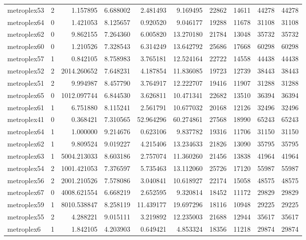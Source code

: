 \begin{longtable}{|l|r|r|r|r|r|r|r|r|r|}
metroplex53 & 2 & 1.157895 & 6.688002 & 2.481493 & 9.169495 & 22862 & 14611 & 44278 & 44278 \\
metroplex64 & 0 & 1.421053 & 8.125657 & 0.920520 & 9.046177 & 19288 & 11678 & 31108 & 31108 \\
metroplex62 & 0 & 9.862155 & 7.264360 & 6.005820 & 13.270180 & 21784 & 13048 & 35732 & 35732 \\
metroplex60 & 0 & 1.210526 & 7.328543 & 6.314249 & 13.642792 & 25686 & 17668 & 60298 & 60298 \\
metroplex57 & 1 & 0.842105 & 8.758983 & 3.765181 & 12.524164 & 22722 & 14558 & 44438 & 44438 \\
metroplex52 & 2 & 2014.260652 & 7.648231 & 4.187854 & 11.836085 & 19723 & 12739 & 38443 & 38443 \\
metroplex51 & 2 & 9.994987 & 8.457790 & 3.764917 & 12.222707 & 19416 & 11907 & 31288 & 31288 \\
metroplex65 & 0 & 1012.097744 & 6.844530 & 3.626811 & 10.471341 & 22682 & 13510 & 36394 & 36394 \\
metroplex61 & 1 & 6.751880 & 8.115241 & 2.561791 & 10.677032 & 20168 & 12126 & 32496 & 32496 \\
metroplex41 & 0 & 0.368421 & 7.310565 & 52.964296 & 60.274861 & 27568 & 18990 & 65243 & 65243 \\
metroplex64 & 1 & 1.000000 & 9.214676 & 0.623106 & 9.837782 & 19316 & 11706 & 31150 & 31150 \\
metroplex62 & 1 & 9.809524 & 9.019227 & 4.215406 & 13.234633 & 21826 & 13090 & 35795 & 35795 \\
metroplex63 & 1 & 5004.213033 & 8.603186 & 2.757074 & 11.360260 & 21456 & 13838 & 41964 & 41964 \\
metroplex54 & 2 & 1001.421053 & 7.376597 & 5.735463 & 13.112060 & 25726 & 17120 & 55987 & 55987 \\
metroplex56 & 2 & 2001.210526 & 7.578086 & 3.040841 & 10.618927 & 22174 & 15058 & 48575 & 48575 \\
metroplex67 & 0 & 4008.621554 & 6.668219 & 2.652595 & 9.320814 & 18452 & 11172 & 29829 & 29829 \\
metroplex59 & 1 & 8010.538847 & 8.258119 & 11.439177 & 19.697296 & 18116 & 10948 & 29225 & 29225 \\
metroplex55 & 2 & 4.288221 & 9.015111 & 3.219892 & 12.235003 & 21688 & 12944 & 35617 & 35617 \\
metroplex6 & 1 & 1.842105 & 4.203903 & 0.649421 & 4.853324 & 18356 & 11218 & 29874 & 29874 \\

\end{longtable}
